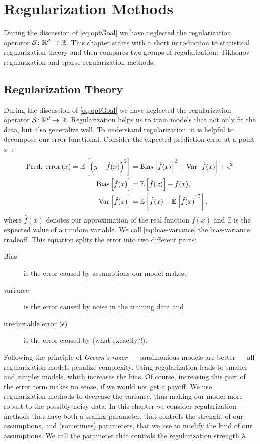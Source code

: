 \chapter{Regularization Methods\label{cha:regularization}}
During the discussion of \vref{eq:optGoal} we have neglected the regularization
operator \(\mathcal{S} \colon \mathbb{R}^d \to \mathbb{R}\).
This chapter starts with a short introduction to statistical regularization
theory and then compares two groups of regularization:
Tikhonov regularization and sparse regularization methods.

\section{Regularization Theory}
During the discussion of \vref{eq:optGoal} we have neglected the regularization
operator \(\mathcal{S} \colon \mathbb{R}^d \to \mathbb{R}\).
Regularization helps us to train models that not only fit the data, but also generalize well.
To understand regularization, it is helpful to decompose our error functional.
Consider the expected prediction error at a point \(x\)~\cite{esl}:
\begin{align}
  \label{eq:bias-variance}
  \text{Pred. error}\left( x \right) = \operatorname{\operatorname{\mathbb{E}}} \left[ \left(y - \hat{f}(x) \right)^2 \right] &=
              \operatorname{\operatorname{Bias}}\left[\hat{f}(x) \right]^2 + \operatorname{\operatorname{Var}}\left[\hat{f}(x)\right] + \epsilon^2 \\
  \operatorname{\operatorname{Bias}} \left[ \hat{f} (x) \right] &= \operatorname{\operatorname{\mathbb{E}}} \left[\hat{f}(x)\right] - f(x), \nonumber \\
  \operatorname{\operatorname{Var}} \left[ \hat{f} (x) \right] &= \operatorname{\operatorname{\mathbb{E}}} \left[ \hat{f}(x) - \operatorname{\operatorname{\mathbb{E}}} \left[ \hat{f}(x) \right]^2 \right] \nonumber,
\end{align}
where \(\hat{f}(x)\) denotes our approximation of the real function \(f(x)\) and \(\mathbb{E}\) is the expected value of a random variable.
We call \cref{eq:bias-variance} the bias-variance tradeoff.
This equation splits the error into two different parts:
\begin{description}
\item[Bias] is the error caused by assumptions our model makes,
\item[variance] is the error caused by noise in the training data and
\item[irreduziable error (\(\epsilon\))] is the error caused by (what excactly?!).
\end{description}

Following the principle of \emph{Occam's razor} --- parsimonious models are better --- all regularization models penalize complexity.
Using regularization leads to smaller and simpler models, which increases the bias.
Of course, increasing this part of the error term makes no sense, if we would not get a payoff.
We use regularization methods to decrease the variance, thus making our model more robust to the possibly noisy data.
In this chapter we consider regularization methods that have both a scaling parameter, that controls the strenght of our assumptions, and (sometimes) parameters, that we use to modify the kind of our assumptions.
We call the parameter that controls the regularization strength \(\lambda\).

